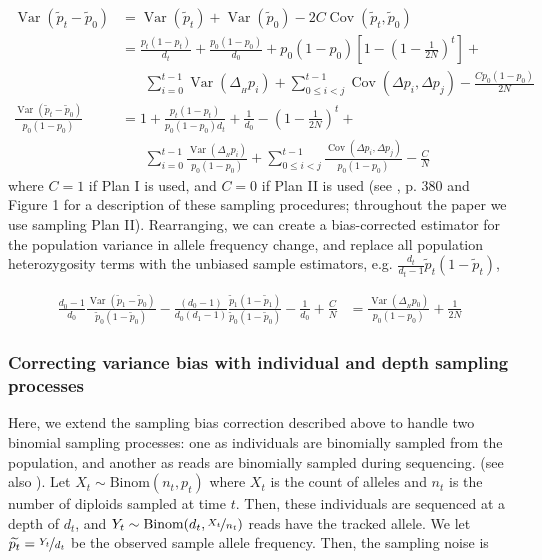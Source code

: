 \documentclass[11pt]{article}
\DeclareMathOperator{\var}{Var}
\DeclareMathOperator{\cov}{Cov}
\begin{document}
\begin{align}
  \var(\widetilde{p}_t - \widetilde{p}_0) &= \var(\widetilde{p}_t) + \var(\widetilde{p}_0) - 2 C \cov(\widetilde{p}_t, \widetilde{p}_0) \\
                                          &= \frac{p_t(1-p_t)}{d_t}  + \frac{p_0(1-p_0)}{d_0} + p_0(1-p_0) \left[1 - \left(1-\frac{1}{2N}\right)^t \right] + \\ & \;\;\;\;\;\;
                                               \sum_{i=0}^{t-1} \var(\Delta_{_H} p_i)  + \sum_{0 \le i < j}^{t-1} \cov(\Delta p_i, \Delta p_j) - \frac{C p_0(1-p_0)}{2N} \\
  \frac{\var(\widetilde{p}_t - \widetilde{p}_0)}{p_0(1-p_0)} &= 1 + \frac{p_t(1-p_t)}{p_0(1-p_0)d_t}  + \frac{1}{d_0} - \left(1-\frac{1}{2N}\right)^t + \\ & \;\;\;\;\;\;
  \sum_{i=0}^{t-1} \frac{\var(\Delta_{_H} p_i)}{p_0(1-p_0)}  + \sum_{0 \le i < j}^{t-1} \frac{\cov(\Delta p_i, \Delta p_j)}{p_0(1-p_0)} - \frac{C}{N}
\end{align}
%
where $C = 1$ if Plan I is used, and $C=0$ if Plan II is used (see
\cite{Waples1989-sj}, p. 380 and Figure 1 for a description of these sampling
procedures; throughout the paper we use sampling Plan II). Rearranging, we can
create a bias-corrected estimator for the population variance in allele
frequency change, and replace all population heterozygosity terms with the
unbiased sample estimators, e.g. $\frac{d_t}{d_t-1} \widetilde{p}_t (1-
\widetilde{p}_t)$,

\begin{align}
  \label{supp:eqn-depth-only-correction}
  \frac{d_0-1}{d_0} \frac{\var(\widetilde{p}_1 - \widetilde{p}_0)}{\widetilde{p}_0(1-\widetilde{p}_0)} - \frac{(d_0-1)}{d_0 (d_1 - 1)} \frac{\widetilde{p}_1(1-\widetilde{p}_1)}{\widetilde{p}_0(1-\widetilde{p}_0)} - \frac{1}{d_0} + \frac{C}{N}  &= \frac{\var(\Delta_{_H} p_0)}{p_0(1-p_0)} + \frac{1}{2N} 
\end{align}

\subsubsection{Correcting variance bias with individual and depth sampling processes}
\label{supp:ind-depth-var-corr}

Here, we extend the sampling bias correction described above to handle two
binomial sampling processes: one as individuals are binomially sampled from the
population, and another as reads are binomially sampled during sequencing.
(see also \cite{Jonas2016-ia}). Let $X_t \sim \text{Binom}(n_t, p_t)$ where
$X_t$ is the count of alleles and $n_t$ is the number of diploids sampled at
time $t$. Then, these individuals are sequenced at a depth of $d_t$, and $Y_t
\sim \text{Binom}(d_t, \nicefrac{X_t}{n_t})$ reads have the tracked allele. We
let $\widetilde{p_t} = \nicefrac{Y_t}{d_t}$ be the observed sample allele
frequency. Then, the sampling noise is 
\end{document}
